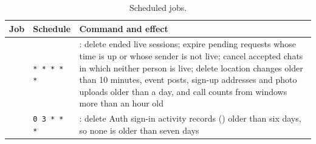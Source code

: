\begin{table}[ht]
  \centering
  \caption{Scheduled jobs.}
  \label{tab:cron}
  \tablefont
  \begin{tabularx}{\textwidth}{@{}L{30mm}L{24mm}Y@{}}
    \toprule
    \textsf{\textbf{Job}} & \textsf{\textbf{Schedule}} & \textsf{\textbf{Command and effect}} \\
    \midrule
     & \texttt{* * * * *} & : delete ended live sessions; expire pending requests whose time is up or whose sender is not live; cancel accepted chats in which neither person is live; delete location changes older than 10 minutes, event posts, sign-up addresses and photo uploads older than a day, and call counts from windows more than an hour old \\
     & \texttt{0 3 * * *} & : delete Auth sign-in activity records () older than six days, so none is older than seven days \\
    \bottomrule
  \end{tabularx}
\end{table}
